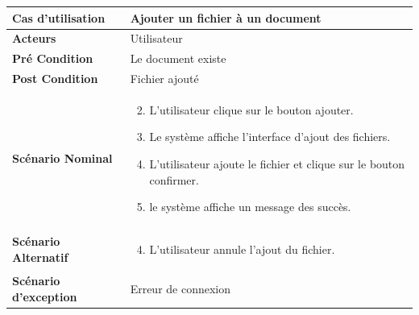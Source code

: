 \begin{longtable}{|p{5cm}|p{10cm}|}
\hline
\textbf{Cas d'utilisation}&Ajouter un fichier à un document\\
\hline
\textbf{Acteurs}&Utilisateur\\
\hline
\textbf{Pré Condition}&Le document existe\\
\hline
\textbf{Post Condition}&Fichier ajouté\\
\hline
\textbf{Scénario Nominal}&
\vspace{-\baselineskip}
\begin{enumerate}
    \setcounter{enumi}{1}
    \item L'utilisateur clique sur le bouton ajouter.
    \item Le système affiche l'interface d'ajout des fichiers.
    \item L'utilisateur ajoute le fichier et clique sur le bouton confirmer.
    \item le système affiche un message des succès.
    
    
\end{enumerate}\\
\hline
\textbf{Scénario Alternatif}&
\vspace{-\baselineskip}
\begin{enumerate}
    \setcounter{enumi}{3}
    \item L'utilisateur annule l'ajout du fichier.
\end{enumerate}\\
\hline
\textbf{Scénario d'exception}&Erreur de connexion\\
\hline
\end{longtable}



    
